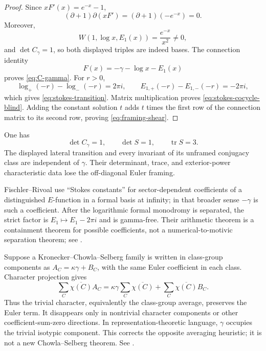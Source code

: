 \begin{proof}
Since \(xF'(x)=e^{-x}-1\),
\[
 (\partial+1)\partial(xF')=(\partial+1)(-e^{-x})=0.
\]
Moreover,
\[
 W(1,\log x,E_1(x))=\frac{e^{-x}}{x^2}\ne0,
\]
and \(\det C_\gamma=1\), so both displayed triples are indeed bases.
The connection identity
\[
 F(x)=-\gamma-\log x-E_1(x)
\]
proves \eqref{eq:C-gamma}.  For \(r>0\),
\[
 \log_+(-r)-\log_-(-r)=2\pi i,
 \qquad
 E_{1,+}(-r)-E_{1,-}(-r)=-2\pi i,
\]
which gives \eqref{eq:stokes-transition}.  Matrix multiplication proves
\eqref{eq:stokes-cocycle-blind}.  Adding the constant solution \(t\) adds
\(t\) times the first row of the connection matrix to its second row,
proving \eqref{eq:framing-shear}.
\end{proof}

\begin{corollary}
\label{cor:stokes-exterior-blind}
One has
\[
 \det C_\gamma=1,
 \qquad \det S=1,
 \qquad \operatorname{tr}S=3.
\]
The displayed lateral transition and every invariant of its unframed
conjugacy class are independent of \(\gamma\).  Their determinant, trace,
and exterior-power characteristic data lose the off-diagonal Euler framing.
\end{corollary}

\begin{remark}
Fischler--Rivoal use ``Stokes constants'' for sector-dependent coefficients
of a distinguished \(E\)-function in a formal basis at infinity; in that
broader sense \(-\gamma\) is such a coefficient.  After the logarithmic
formal monodromy is separated, the strict factor is
\(E_1\mapsto E_1-2\pi i\) and is gamma-free.  Their arithmetic theorem is a
containment theorem for possible coefficients, not a numerical-to-motivic
separation theorem; see \cite{FischlerRivoal2016}.
\end{remark}

\begin{remark}
\label{rem:Chowla-Selberg-correction}
Suppose a Kronecker--Chowla--Selberg family is written in class-group
components as \(A_C=\kappa\gamma+B_C\), with the same Euler coefficient in
each class.  Character projection gives
\[
 \sum_C\overline{\chi(C)}A_C
 =\kappa\gamma\sum_C\overline{\chi(C)}
 +\sum_C\overline{\chi(C)}B_C.
\]
Thus the trivial character, equivalently the class-group average, preserves
the Euler term.  It disappears only in nontrivial character components or
other coefficient-sum-zero directions.  In representation-theoretic
language, \(\gamma\) occupies the trivial isotypic component.  This corrects
the opposite averaging heuristic; it is not a new Chowla--Selberg theorem.
See \cite{GrossCS}.
\end{remark}

